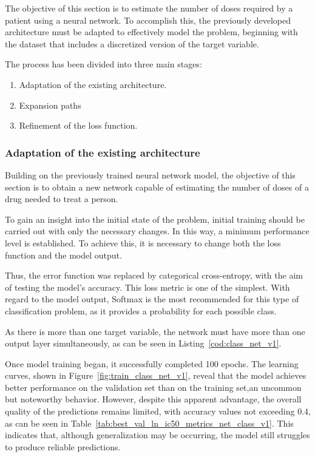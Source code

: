 The objective of this section is to estimate the number of doses required by a patient using a neural network. To accomplish this, the previously developed architecture must be adapted to effectively model the problem, beginning with the dataset that includes a discretized version of the target variable.

The process has been divided into three main stages:

\begin{enumerate}
    \item Adaptation of the existing architecture.
    \item Expansion paths
    \item Refinement of the loss function.
\end{enumerate}

\subsubsection{Adaptation of the existing architecture}

Building on the previously trained neural network model, the objective of this section is to obtain a new network capable of estimating the number of doses of a drug needed to treat a person. 

To gain an insight into the initial state of the problem, initial training should be carried out with only the necessary changes. In this way, a minimum performance level is established. To achieve this, it is necessary to change both the loss function and the model output.

Thus, the error function was replaced by categorical cross-entropy, with the aim of testing the model's accuracy. This loss metric is one of the simplest. With regard to the model output, Softmax is the most recommended for this type of classification problem, as it provides a probability for each possible class. 

As there is more than one target variable, the network must have more than one output layer simultaneously, as can be seen in Listing~\ref{cod:class_net_v1}.

Once model training began, it successfully completed 100 epochs. The learning curves, shown in Figure~\ref{fig:train_class_net_v1}, reveal that the model achieves better performance on the validation set than on the training set,an uncommon but noteworthy behavior. However, despite this apparent advantage, the overall quality of the predictions remains limited, with accuracy values not exceeding 0.4, as can be seen in Table~\ref{tab:best_val_ln_ic50_metrics_net_class_v1}. This indicates that, although generalization may be occurring, the model still struggles to produce reliable predictions.

